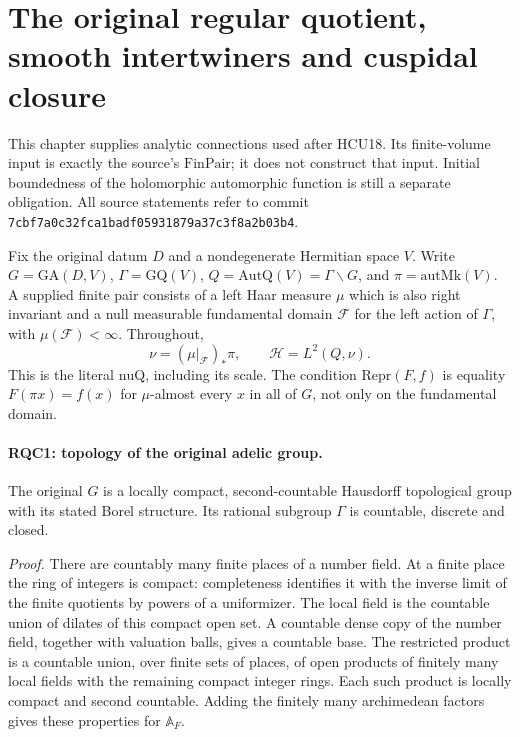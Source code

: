 \documentclass[11pt,a4paper]{article}
\numberwithin{equation}{section}
\theoremstyle{remark}\newtheorem{remark}[theorem]{Remark}
\begin{document}
\section{The original regular quotient, smooth intertwiners and cuspidal closure}
\label{sec:regular-quotient}

This chapter supplies analytic connections used after HCU18.
Its finite-volume input is exactly the source's \(\mathrm{FinPair}\);
it does not construct that input.  Initial boundedness of the
holomorphic automorphic function is still a separate obligation.
All source statements refer to commit
\texttt{7cbf7a0c32fca1badf05931879a37c3f8a2b03b4}.

Fix the original datum \(D\) and a nondegenerate Hermitian space \(V\).
Write \(G=\mathrm{GA}(D,V)\), \(\Gamma=\mathrm{GQ}(V)\),
\(Q=\mathrm{AutQ}(V)=\Gamma\backslash G\), and
\(\pi=\mathrm{autMk}(V)\).  A supplied finite pair consists of a
left Haar measure \(\mu\) which is also right invariant and a null
measurable fundamental domain \(\mathcal F\) for the left action of
\(\Gamma\), with \(\mu(\mathcal F)<\infty\).  Throughout,
\[
 \nu=(\mu|_{\mathcal F})_*\pi,\qquad
 \mathcal H=L^2(Q,\nu).
 \tag{RQC.1}
\]
This is the literal \(\mathrm{nuQ}\), including its scale.
The condition \(\mathrm{Repr}(F,f)\) is equality
\(F(\pi x)=f(x)\) for \(\mu\)-almost every \(x\) in all of \(G\),
not only on the fundamental domain.

\paragraph{RQC1: topology of the original adelic group.}
\label{claim:RQC1}
The original \(G\) is a locally compact, second-countable Hausdorff
topological group with its stated Borel structure.  Its rational
subgroup \(\Gamma\) is countable, discrete and closed.

\emph{Proof.}
There are countably many finite places of a number field.  At a finite
place the ring of integers is compact: completeness identifies it
with the inverse limit of the finite quotients by powers of a
uniformizer.  The local field is the countable union of dilates of
this compact open set.  A countable dense copy of the number field,
together with valuation balls, gives a countable base.  The
restricted product is a countable union, over finite sets of places,
of open products of finitely many local fields with the remaining
compact integer rings.  Each such product is locally compact and
second countable.  Adding the finitely many archimedean factors
gives these properties for \(\mathbb A_F\).
\end{document}
